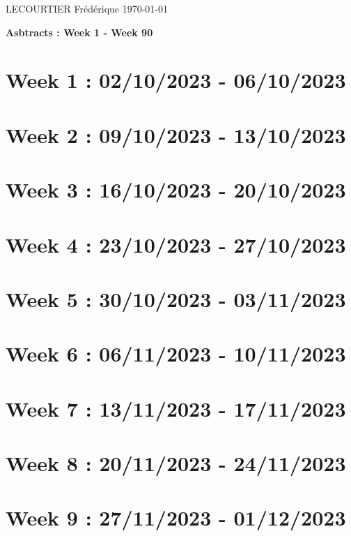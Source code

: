 \documentclass[french]{article}
\begin{document}
	LECOURTIER Frédérique \hfill \today
	\begin{center}
		\Large\textbf{{Asbtracts : Week 1 - Week 90}}
	\end{center}

	\section{Week 1 : 02/10/2023 - 06/10/2023}
	

	\section{Week 2 : 09/10/2023 - 13/10/2023}
	

	\section{Week 3 : 16/10/2023 - 20/10/2023}
	

	\section{Week 4 : 23/10/2023 - 27/10/2023}
	

	\section{Week 5 : 30/10/2023 - 03/11/2023}
	

	\section{Week 6 : 06/11/2023 - 10/11/2023}
	

	\section{Week 7 : 13/11/2023 - 17/11/2023}
	

	\section{Week 8 : 20/11/2023 - 24/11/2023}
	

	\section{Week 9 : 27/11/2023 - 01/12/2023}
	
\end{document}
